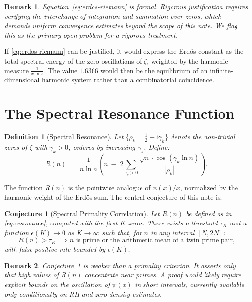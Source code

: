 \documentclass[11pt,a4paper]{article}
\newtheorem{conjecture}{Conjecture}
\newtheorem{remark}{Remark}
\newtheorem{definition}{Definition}
\begin{document}
\begin{remark}
Equation~\eqref{eq:erdos-riemann} is formal. Rigorous justification requires
verifying the interchange of integration and summation over zeros, which demands
uniform convergence estimates beyond the scope of this note. We flag this as the
primary open problem for a rigorous treatment.
\end{remark}

If \eqref{eq:erdos-riemann} can be justified, it would express the Erd\H{o}s
constant as the total spectral energy of the zero-oscillations of $\zeta$, weighted
by the harmonic measure $\frac{1}{x \ln x}$. The value $1.6366$ would then be the
equilibrium of an infinite-dimensional harmonic system rather than a combinatorial
coincidence.

\section{The Spectral Resonance Function}

\begin{definition}[Spectral Resonance]
Let $\{\rho_k = \frac{1}{2} + i\gamma_k\}$ denote the non-trivial zeros of $\zeta$
with $\gamma_k > 0$, ordered by increasing $\gamma_k$. Define:
\begin{equation}
  R(n) \;=\; \frac{1}{n \ln n}
  \left( n \;-\; 2 \sum_{\gamma_k > 0}
  \frac{\sqrt{n} \cdot \cos(\gamma_k \ln n)}{|\rho_k|} \right).
  \label{eq:resonance}
\end{equation}
\end{definition}

The function $R(n)$ is the pointwise analogue of $\psi(x)/x$, normalized by the
harmonic weight of the Erd\H{o}s sum. The central conjecture of this note is:

\begin{conjecture}[Spectral Primality Correlation]
\label{conj:main}
Let $R(n)$ be defined as in \eqref{eq:resonance}, computed with the first $K$ zeros.
There exists a threshold $\tau_K$ and a function $\epsilon(K) \to 0$ as $K \to \infty$
such that, for $n$ in any interval $[N, 2N]$:
\[
  R(n) > \tau_K \implies n \text{ is prime or the arithmetic mean of a twin prime pair,}
\]
with false-positive rate bounded by $\epsilon(K)$.
\end{conjecture}

\begin{remark}
Conjecture~\ref{conj:main} is weaker than a primality criterion. It asserts only
that high values of $R(n)$ concentrate near primes. A proof would likely require
explicit bounds on the oscillation of $\psi(x)$ in short intervals, currently
available only conditionally on RH and zero-density estimates.
\end{remark}
\end{document}
